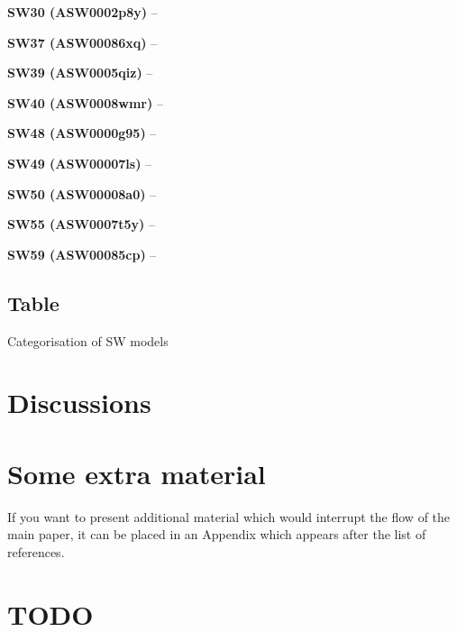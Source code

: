 \documentclass[fleqn,usenatbib]{mnras}
\newcommand{\lenstitle}[1]{\noindent\textbf{#1} --}
\begin{document}
\lenstitle{SW30 (ASW0002p8y)}

\lenstitle{SW37 (ASW00086xq)}

\lenstitle{SW39 (ASW0005qiz)}

\lenstitle{SW40 (ASW0008wmr)}

\lenstitle{SW48 (ASW0000g95)}

\lenstitle{SW49 (ASW00007ls)}

\lenstitle{SW50 (ASW00008a0)}

\lenstitle{SW55 (ASW0007t5y)}

\lenstitle{SW59 (ASW00085cp)}


\subsection{Table}

\begin{table}
  \caption{Categorisation of SW models}
  \label{tab:models}

\end{table}



\section{Discussions}










\appendix

\section{Some extra material}

If you want to present additional material which would interrupt the flow of the main paper,
it can be placed in an Appendix which appears after the list of references.


\clearpage

\section{TODO}
\listoftodos




\bsp	%
\label{lastpage}
\end{document}
